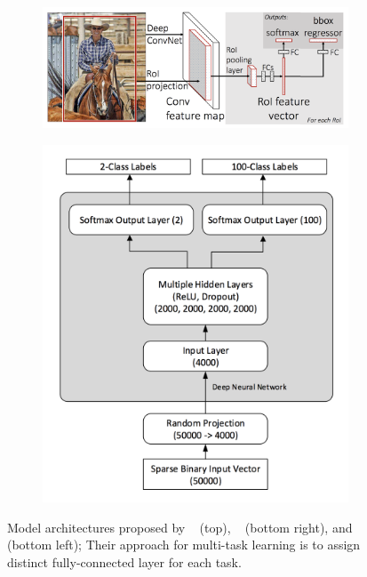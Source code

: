 \documentclass{article}
\begin{document}
\begin{figure}[t!]
	\centering
	\begin{subfigure}[b]{.65\linewidth}
		\centering
		\includegraphics[scale=0.22,trim={0mm 0mm 0mm 0mm},clip]{girshick2015fast.png}
	\end{subfigure}%
	\begin{subfigure}[b]{.35\linewidth}
		\centering
		\includegraphics[scale=0.13,trim={0mm 0mm 0mm 0mm},clip]{huang2016mtnet.png}
	\end{subfigure}
	\caption{Model architectures proposed by ~\cite{long2017learning} (top), ~\cite{huang2016mtnet} (bottom right), and  ~\cite{girshick2015fast} (bottom left); Their approach for multi-task learning is to assign distinct fully-connected layer for each task.}
	\label{figure:mutli-task-learning}
\end{figure}
\end{document}
